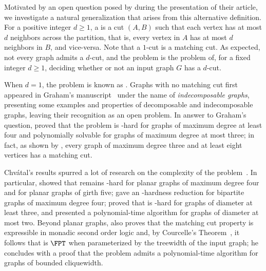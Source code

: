 Motivated by an open question posed by \cite{matching_cut_ipec} during the presentation of their article,  we investigate a natural generalization that arises from this alternative definition.
For a positive integer $d \geq 1$, a  is a cut $(A, B)$ such that each vertex has at most $d$ neighbors across the partition, that is, every vertex in $A$ has at most $d$ neighbors in $B$, and vice-versa. Note that a $1$-cut is a matching cut.
As expected, not every graph admits a $d$-cut, and the  problem is the problem of, for a fixed integer $d \geq 1$, deciding whether or not an input graph $G$ has a $d$-cut.


When $d=1$, the problem is known as .
Graphs with no matching cut first appeared in Graham's manuscript~\citep{matching_cut_graham} under the name of \textit{indecomposable graphs}, presenting some examples and properties of decomposable and indecomposable graphs, leaving their recognition as an open problem.
In answer to Graham's question, \cite{chvatal_matching_cut} proved that the problem is \NP-hard for graphs of maximum degree at least four and polynomially solvable for graphs of maximum degree at most three; in fact, as shown by \cite{matching_cut_moshi}, every graph of maximum degree three and at least eight vertices has a matching cut.

Chvátal's results spurred a lot of research on the complexity of the problem~\citep{matching_cut_ipec,matching_cut_structural,matching_cut_tcs, matching_cut_diameter, matching_cut_planar, matching_cut_series_parallel, stable_cutset_line_graphs}.
In particular, \cite{matching_cut_planar} showed that  remains \NP-hard for planar graphs of maximum degree four and for planar graphs of girth five;
\cite{stable_cutset_line_graphs} gave an \NP-hardness reduction for bipartite graphs of maximum degree four;
\cite{matching_cut_diameter} proved that  is \NP-hard for graphs of diameter at least three, and presented a polynomial-time algorithm for graphs of diameter at most two.
Beyond planar graphs, \cite{matching_cut_planar} also proves that the matching cut property is expressible in monadic second order logic and, by Courcelle's Theorem~\citep{courcelle_theorem}, it follows that  is $\FPT$ when parameterized by the treewidth of the input graph; he concludes with a proof that the problem admits a polynomial-time algorithm for graphs of bounded cliquewidth.

